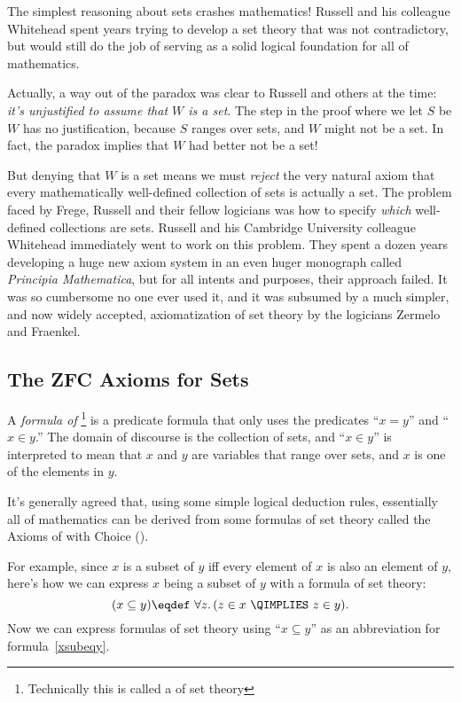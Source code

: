 The simplest reasoning about sets crashes mathematics!  Russell and his
colleague Whitehead spent years trying to develop a set theory that was
not contradictory, but would still do the job of serving as a solid
logical foundation for all of mathematics.

Actually, a way out of the paradox was clear to Russell and others at
the time: \emph{it's unjustified to assume that $W$ is a set}.  The
step in the proof where we let $S$ be $W$ has no justification,
because $S$ ranges over sets, and $W$ might not be a set.  In fact, the
paradox implies that $W$ had better not be a set!

But denying that $W$ is a set means we must \emph{reject} the very
natural axiom that every mathematically well-defined collection of
sets is actually a set.  The problem faced by Frege, Russell and their
fellow logicians was how to specify \emph{which} well-defined
collections are sets.  Russell and his Cambridge University colleague
Whitehead immediately went to work on this problem.  They spent a
dozen years developing a huge new axiom system in an even huger
monograph called \emph{Principia Mathematica}, but for all intents and
purposes, their approach failed.  It was so cumbersome no one ever
used it, and it was subsumed by a much simpler, and now widely
accepted, axiomatization of set theory by the logicians Zermelo
and Fraenkel.

\subsection{The ZFC Axioms for Sets}\label{ZFC_sec}

A \emph{formula of }\footnote{Technically this is
  called a  of set theory} is a
predicate formula that only uses the predicates ``$x = y$'' and ``$x
\in y$.''  The domain of discourse is the collection of sets, and ``$x
\in y$'' is interpreted to mean that $x$ and $y$ are variables that
range over sets, and $x$ is one of the elements in $y$.

It's generally agreed that, using some simple logical deduction rules,
essentially all of mathematics can be derived from some formulas of set theory
called the Axioms of  with Choice ().

For example, since $x$ is a subset of $y$ iff every element of $x$ is
also an element of $y$, here's how we can express $x$ being a subset
of $y$ with a formula of set theory:
\begin{equation}\label{xsubeqy}
(x \subseteq y) \eqdef\ \forall z.\, (z \in x\ \QIMPLIES\ z \in y).
\end{equation}
Now we can express formulas of set theory using ``$x \subseteq y$'' as
an abbreviation for formula~\eqref{xsubeqy}.

